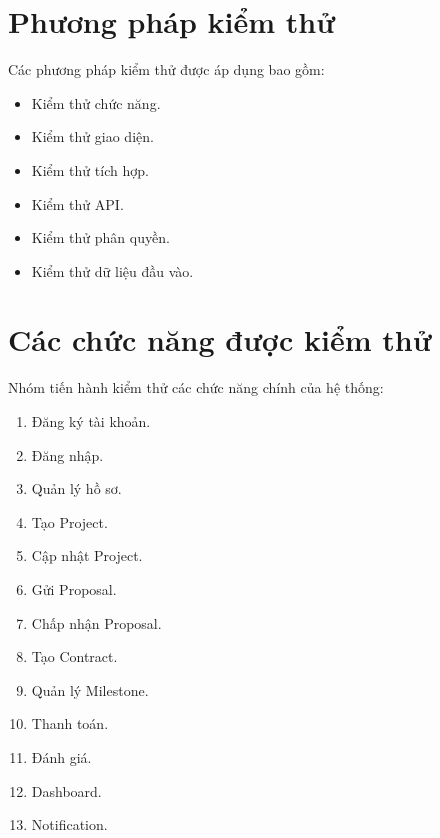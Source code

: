 
\section{Phương pháp kiểm thử}

Các phương pháp kiểm thử được áp dụng bao gồm:

\begin{itemize}

\item Kiểm thử chức năng.

\item Kiểm thử giao diện.

\item Kiểm thử tích hợp.

\item Kiểm thử API.

\item Kiểm thử phân quyền.

\item Kiểm thử dữ liệu đầu vào.

\end{itemize}


\section{Các chức năng được kiểm thử}

Nhóm tiến hành kiểm thử các chức năng chính của hệ thống:

\begin{enumerate}

\item Đăng ký tài khoản.

\item Đăng nhập.

\item Quản lý hồ sơ.

\item Tạo Project.

\item Cập nhật Project.

\item Gửi Proposal.

\item Chấp nhận Proposal.

\item Tạo Contract.

\item Quản lý Milestone.

\item Thanh toán.

\item Đánh giá.

\item Dashboard.

\item Notification.

\end{enumerate}


